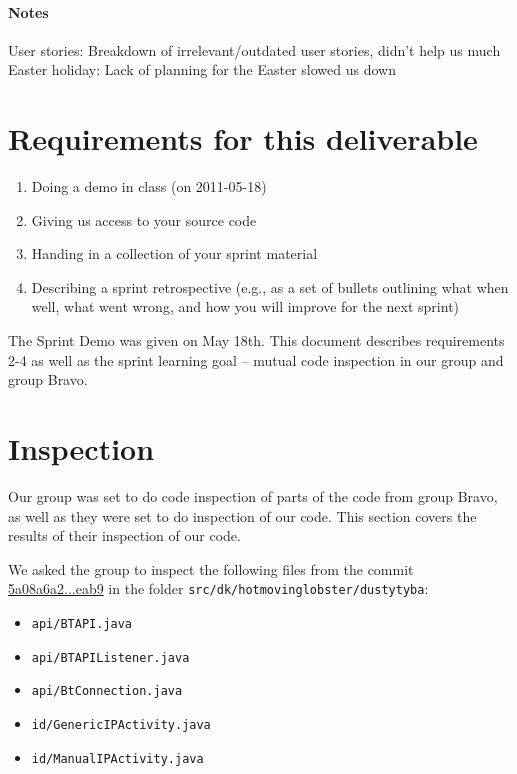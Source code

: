 \documentclass[a4paper,11pt]{article}
\begin{document}
\paragraph{Notes}
User stories: Breakdown of irrelevant/outdated user stories, didn’t help us much
Easter holiday: Lack of planning for the Easter slowed us down

\pagebreak



\section{Requirements for this deliverable}
\begin{enumerate}
\item Doing a demo in class (on 2011-05-18)
\item Giving us access to your source code
\item Handing in a collection of your sprint material
\item Describing a sprint retrospective (e.g., as a set of bullets outlining what
when well, what went wrong, and how you will improve for the next sprint)
\end{enumerate}

The Sprint Demo was given on May 18th. This document describes requirements 2-4 as well as the sprint learning goal -- mutual code inspection in our group and group Bravo.


\section{Inspection}
Our group was set to do code inspection of parts of the code from group Bravo, as well as they were set to do inspection of our code. This section covers the results of their inspection of our code.

We asked the group to inspect the following files from the commit \href{https://github.com/omegahm/DBP2P/commit/5a08a6a2c3a4d11663ae10a8ee2b371f69f2eab9}{5a08a6a2...eab9} in the folder {\tt src/dk/hotmovinglobster/dustytyba}:

\begin{itemize}
\item {\tt api/BTAPI.java}
\item {\tt api/BTAPIListener.java}
\item {\tt api/BtConnection.java}
\item {\tt id/GenericIPActivity.java}
\item {\tt id/ManualIPActivity.java}
\end{itemize}
\end{document}
